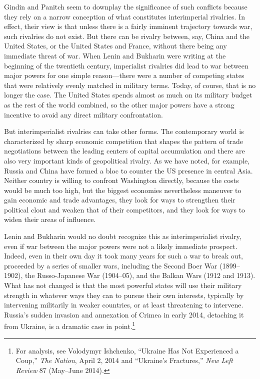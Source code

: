 Gindin and Panitch seem to downplay the significance of such conflicts because they rely on a narrow conception of what constitutes interimperial rivalries. In effect, their view is that unless there is a fairly imminent trajectory towards war, such rivalries do not exist. But there can be rivalry between, say, China and the United States, or the United States and France, without there being any immediate threat of war. When Lenin and Bukharin were writing at the beginning of the twentieth century, imperialist rivalries did lead to war between major powers for one simple reason---there were a number of competing states that were relatively evenly matched in military terms. Today, of course, that is no longer the case. The United States spends almost as much on its military budget as the rest of the world combined, so the other major powers have a strong incentive to avoid any direct military confrontation.

But interimperialist rivalries can take other forms. The contemporary world is characterized by sharp economic competition that shapes the pattern of trade negotiations between the leading centers of capital accumulation and there are also very important kinds of geopolitical rivalry. As we have noted, for example, Russia and China have formed a bloc to counter the US presence in central Asia. Neither country is willing to confront Washington directly, because the costs would be much too high, but the biggest economies nevertheless maneuver to gain economic and trade advantages, they look for ways to strengthen their political clout and weaken that of their competitors, and they look for ways to widen their areas of influence.

Lenin and Bukharin would no doubt recognize this as interimperialist rivalry, even if war between the major powers were not a likely immediate prospect. Indeed, even in their own day it took many years for such a war to break out, proceeded by a series of smaller wars, including the Second Boer War (1899--1902), the Russo-Japanese War (1904--05), and the Balkan Wars (1912 and 1913). What has not changed is that the most powerful states will use their military strength in whatever ways they can to pursue their own interests, typically by intervening militarily in weaker countries, or at least threatening to intervene. Russia's sudden invasion and annexation of Crimea in early 2014, detaching it from Ukraine, is a dramatic case in point.\footnote{For analysis, see Volodymyr Ishchenko, ``Ukraine Has Not Experienced a Coup,'' \emph{The Nation}, April 2, 2014 and ``Ukraine's Fractures,'' \emph{New Left Review} 87 (May--June 2014).}


